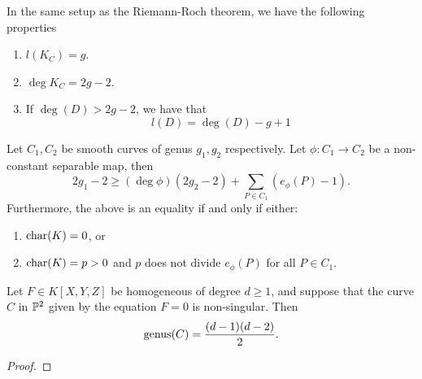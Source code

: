 \begin{corollary}
	In the same setup as the Riemann-Roch theorem, we have the following properties
	\begin{enumerate}[itemsep=0em, label=(\alph*)]
		\item $l(K_C) = g$.
		\item $\deg K_C = 2g - 2$.
		\item If $\deg(D) > 2g - 2$, we have that
			\begin{equation*}
				l(D) = \deg(D) - g + 1
			\end{equation*}	
	\end{enumerate}
\end{corollary}

\begin{theorem}
	Let $C_1, C_2$ be smooth curves of genus $g_1, g_2$ respectively.
	Let $\phi: C_1 \to C_2$ be a non-constant separable map, then
	\begin{equation*}
		2g_1 - 2 \geq (\deg \phi) (2g_2 - 2) + \sum_{P \in C_1}(e_\phi(P) - 1).
	\end{equation*}
	Furthermore, the above is an equality if and only if either:
	\begin{enumerate}[itemsep=0em, label=(\roman*)]
		\item $\operatorname{char}(K) = 0$, or
		\item $\operatorname{char}(K) = p > 0$ and $p$ does not divide $e_\phi(P)$ for all
			$P \in C_1$.
	\end{enumerate}
\end{theorem}

\begin{corollary}
	Let $F \in K[X, Y, Z]$ be homogeneous of degree $d \geq 1$, and suppose that
	the curve $C$ in $\mathbb{P}^2$ given by the equation $F = 0$ is non-singular.
	Then
	\begin{equation*}
		\operatorname{genus}(C) = \frac{(d-1)(d-2)}{2}.
	\end{equation*}
\end{corollary}

\begin{proof}
	
\end{proof}


